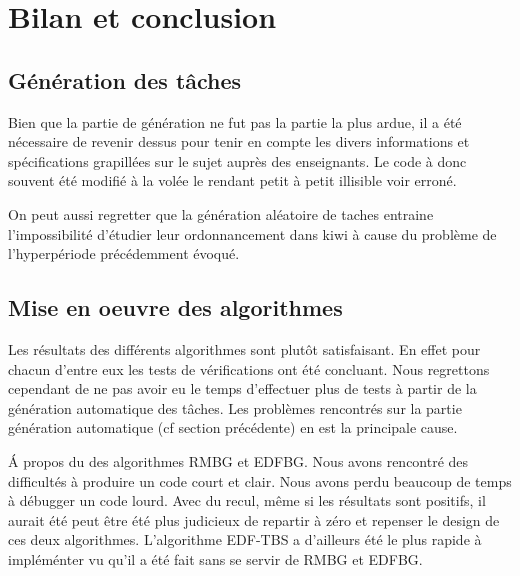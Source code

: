 \chapter{Bilan et conclusion}
\section{Génération des tâches}
Bien que la partie de génération ne fut pas la partie la plus ardue, il a été nécessaire de revenir dessus pour tenir en compte les divers informations et spécifications grapillées sur le sujet auprès des enseignants. Le code à donc souvent été modifié à la volée le rendant petit à petit illisible voir erroné.

On peut aussi regretter que la génération aléatoire de taches entraine l'impossibilité d'étudier leur ordonnancement dans kiwi à cause du problème de l'hyperpériode précédemment évoqué.


\section{Mise en oeuvre des algorithmes}
Les résultats des différents algorithmes sont plutôt satisfaisant. En effet pour chacun d'entre eux les tests de vérifications ont été concluant. Nous regrettons cependant de ne pas avoir eu le temps d'effectuer plus de tests à partir de la génération automatique des tâches. Les problèmes rencontrés sur la partie génération automatique (cf section précédente) en est la principale cause.

\'A propos du des algorithmes RMBG et EDFBG. Nous avons rencontré des difficultés à produire un code court et clair. Nous avons perdu beaucoup de temps à débugger un code lourd. Avec du recul, même si les résultats sont positifs, il aurait été peut être été plus judicieux de repartir à zéro et repenser le design de ces deux algorithmes.  L'algorithme EDF-TBS a d'ailleurs été le plus rapide à impléménter vu qu'il a été fait sans se servir de RMBG et EDFBG.

